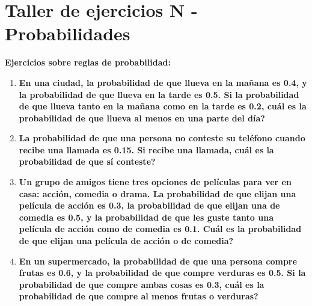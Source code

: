 \documentclass[12pt]{article}
\begin{document}
    

    \section*{\centering  Taller de ejercicios N - Probabilidades} 
    \vspace{0.5cm}\textbf{Ejercicios sobre reglas de probabilidad:} \vspace{0.5cm}

    \begin{enumerate}[label=\textbf{\arabic*.}]
        \item \textbf{En una ciudad, la probabilidad de que llueva en la mañana es 0.4, y la
        probabilidad de que llueva en la tarde es 0.5. Si la probabilidad de que llueva
        tanto en la mañana como en la tarde es 0.2, \textquestiondown cuál es la probabilidad de que
        llueva al menos en una parte del día?}

        \item \textbf{La probabilidad de que una persona no conteste su teléfono cuando recibe una
        llamada es 0.15. Si recibe una llamada, \textquestiondown cuál es la probabilidad de que sí
        conteste?}
        
        \item \textbf{Un grupo de amigos tiene tres opciones de películas para ver en casa: acción,
        comedia o drama. La probabilidad de que elijan una película de acción es 0.3, la
        probabilidad de que elijan una de comedia es 0.5, y la probabilidad de que les
        guste tanto una película de acción como de comedia es 0.1. \textquestiondown Cuál es la
        probabilidad de que elijan una película de acción o de comedia?}
        
        \item \textbf{En un supermercado, la probabilidad de que una persona compre frutas es 0.6,
        y la probabilidad de que compre verduras es 0.5. Si la probabilidad de que
        compre ambas cosas es 0.3, \textquestiondown cuál es la probabilidad de que compre al menos
        frutas o verduras?}
        

\end{enumerate}
\end{document}
